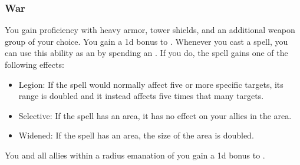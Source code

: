         \subsubsection{War}
             You gain proficiency with heavy armor, tower shields, and an additional weapon group of your choice.
             You gain a \plus1d bonus to .
             Whenever you cast a spell, you can use this ability as an  by spending an .
            If you do, the spell gains one of the following effects:
            \begin{itemize}
                \item Legion: If the spell would normally affect five or more specific targets, its range is doubled and it instead affects five times that many targets.
                \item Selective: If the spell has an area, it has no effect on your allies in the area.
                \item Widened: If the spell has an area, the size of the area is doubled.
            \end{itemize}
             You and all allies within a \arealarge radius emanation of you gain a \plus1d bonus to .

